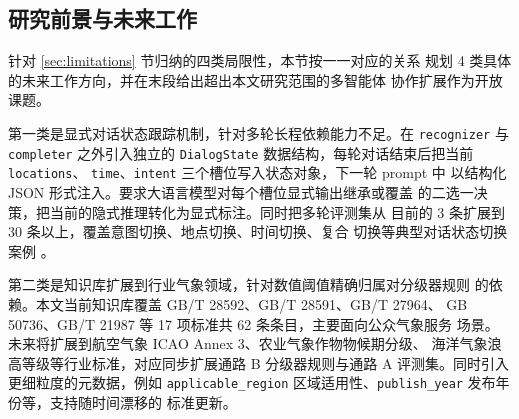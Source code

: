 
\subsection{研究前景与未来工作}
\label{sec:future-work}

针对 \ref{sec:limitations} 节归纳的四类局限性，本节按一一对应的关系
规划 4 类具体的未来工作方向，并在末段给出超出本文研究范围的多智能体
协作扩展作为开放课题。

第一类是显式对话状态跟踪机制，针对多轮长程依赖能力不足。在
\texttt{recognizer} 与 \texttt{completer} 之外引入独立的
\texttt{DialogState} 数据结构，每轮对话结束后把当前 \texttt{locations}、
\texttt{time}、\texttt{intent} 三个槽位写入状态对象，下一轮 prompt 中
以结构化 JSON 形式注入。要求大语言模型对每个槽位显式输出继承或覆盖
的二选一决策，把当前的隐式推理转化为显式标注。同时把多轮评测集从
目前的 3 条扩展到 30 条以上，覆盖意图切换、地点切换、时间切换、复合
切换等典型对话状态切换案例 \cite{ref29}。

第二类是知识库扩展到行业气象领域，针对数值阈值精确归属对分级器规则
的依赖。本文当前知识库覆盖 GB/T 28592、GB/T 28591、GB/T 27964、
GB 50736、GB/T 21987 等 17 项标准共 62 条条目，主要面向公众气象服务
场景。未来将扩展到航空气象 ICAO Annex 3、农业气象作物物候期分级、
海洋气象浪高等级等行业标准，对应同步扩展通路 B 分级器规则与通路 A
评测集。同时引入更细粒度的元数据，例如 \texttt{applicable\_\bk{}region}
区域适用性、\texttt{publish\_\bk{}year} 发布年份等，支持随时间漂移的
标准更新。

